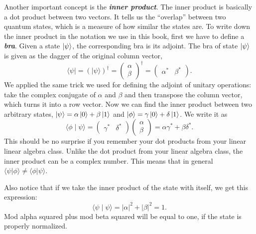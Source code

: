 Another important concept is the \textbf{\emph{inner product}}. The inner product is basically a dot product between two vectors.
It tells us the ``overlap'' between two quantum states, which is a measure of how similar the states are. To write down the inner product in the notation we use in this book, first we have to define a \textbf{\emph{bra}}. Given a state $\left| \psi \right\rangle$, the corresponding bra is its adjoint. The bra of state $\left| \psi \right\rangle$ is given as the dagger of the original column vector,
\begin{equation}
\langle\psi|=(|\psi\rangle)^{\dagger}=\left(\begin{array}{l}
\alpha \\
\beta
\end{array}\right)^{\dagger}=\left(\begin{array}{ll}
\alpha^{*} & \beta^{*}
\end{array}\right).
\end{equation}
We applied the same trick we used for defining the adjoint of unitary operations: take the complex conjugate of $\alpha$ and $\beta$ and then transpose the column vector, which turns it into a row vector. Now we can find the inner product between two arbitrary states, $\left| \psi \right\rangle = \alpha\left| 0 \right\rangle + \beta\left| 1 \right\rangle$ and $\left| \phi \right\rangle = \gamma\left| 0 \right\rangle + \delta\left| 1 \right\rangle$. We write it as 
\begin{equation}
\langle\phi \mid \psi\rangle=\left(\begin{array}{ll}
\gamma^{*} & \delta^{*}
\end{array}\right)\left(\begin{array}{c}
\alpha \\
\beta
\end{array}\right)=\alpha \gamma^{*}+\beta \delta^{*}.
\end{equation}
This should be no surprise if you remember your dot products from your linear linear algebra class.
Unlike the dot product from your linear algebra class, the inner product can be a complex number.
This means that in general $\langle\psi|\phi\rangle \neq \langle\phi|\psi\rangle$.

Also notice that if we take the inner product of the state with itself, we get this expression:
\begin{equation}
\langle\psi \mid \psi\rangle=|\alpha|^{2}+|\beta|^{2}=1.
\end{equation}
Mod alpha squared plus mod beta squared will be equal to one, if the state is properly normalized.

